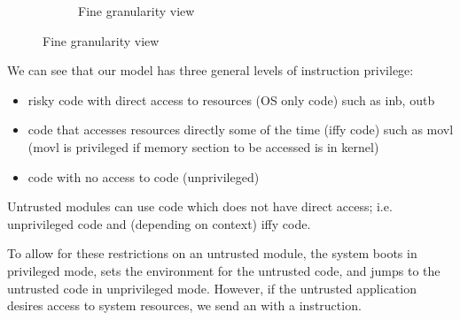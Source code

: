 \documentclass[../../lecture_notes.tex]{subfiles}
\begin{document}
\begin{figure}[H]
\begin{subfigure}{0.45\textwidth}
{
}
\caption{Fine granularity view}
\end{subfigure}
\end{figure}

We can see that our model has three general levels of instruction privilege:
\begin{itemize}
\item risky code with direct access to resources (OS only code) such as inb, outb
\item code that accesses resources directly some of the time (iffy code) such as movl \\ 
	(movl is privileged if memory section to be accessed is in kernel)
\item code with no access to code (unprivileged)
\end{itemize}
Untrusted modules can use code which does not have direct access; i.e. unprivileged code and (depending on context) iffy code.

To allow for these restrictions on an untrusted module, the system boots in privileged mode, sets the environment for the untrusted code, and jumps to the untrusted code in unprivileged mode. However, if the untrusted application desires access to system resources, we send an  with a  instruction.
\end{document}
